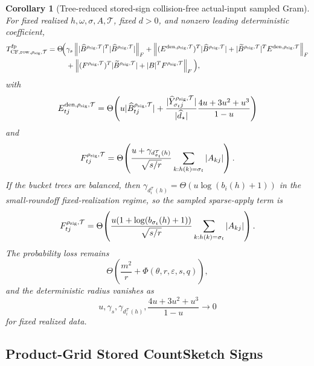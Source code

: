 \documentclass[11pt]{article}
\newcommand{\Frob}[1]{\left\lVert #1\right\rVert_F}
\newcommand{\eps}{\varepsilon}
\newtheorem{corollary}[theorem]{Corollary}
\theoremstyle{remark}
\begin{document}
\begin{corollary}[Tree-reduced stored-sign collision-free actual-input sampled Gram]
For fixed realized \(h,\omega,\sigma,A,\mathcal T\), fixed \(d>0\), and
nonzero leading deterministic coefficient,
\[
\begin{aligned}
  T_{{\rm CF,row},\rho_{\rm sig},\mathcal T}^{\rm fp}
  =
  \Theta\!\Big(
  &\gamma_s\Frob{
      |\widehat B^{\rho_{\rm sig},\mathcal T}|^T
      |\widehat B^{\rho_{\rm sig},\mathcal T}|}
  +
  \Frob{
      (E^{{\rm den},\rho_{\rm sig},\mathcal T})^T
      |\widehat B^{\rho_{\rm sig},\mathcal T}|
      +
      |\widetilde B^{\rho_{\rm sig},\mathcal T}|^T
      E^{{\rm den},\rho_{\rm sig},\mathcal T}}
  \\
  &+
  \Frob{
      (F^{\rho_{\rm sig},\mathcal T})^T
      |\widetilde B^{\rho_{\rm sig},\mathcal T}|
      +
      |B|^TF^{\rho_{\rm sig},\mathcal T}}
  \Big),
\end{aligned}
\]
with
\[
  E^{{\rm den},\rho_{\rm sig},\mathcal T}_{tj}
  =
  \Theta\!\left(
    u|\widehat B^{\rho_{\rm sig},\mathcal T}_{tj}|
    +
    \frac{|\widehat Y^{\rho_{\rm sig},\mathcal T}_{\sigma_tj}|}
         {|\widehat d_\star|}
    \frac{4u+3u^2+u^3}{1-u}
  \right)
\]
and
\[
  F^{\rho_{\rm sig},\mathcal T}_{tj}
  =
  \Theta\!\left(
    \frac{u+\gamma_{d_{\sigma_t}^{\mathcal T}(h)}}{\sqrt{s/r}}
    \sum_{k:h(k)=\sigma_t}|A_{kj}|
  \right).
\]
If the bucket trees are balanced, then
\(\gamma_{d_i^{\mathcal T}(h)}=\Theta(u\log(b_i(h)+1))\) in the
small-roundoff fixed-realization regime, so the sampled sparse-apply term is
\[
  F^{\rho_{\rm sig},\mathcal T}_{tj}
  =
  \Theta\!\left(
    \frac{u(1+\log(b_{\sigma_t}(h)+1))}{\sqrt{s/r}}
    \sum_{k:h(k)=\sigma_t}|A_{kj}|
  \right).
\]
The probability loss remains
\[
  \Theta\!\left(\frac{m^2}{r}+\Phi(\theta,r,\eps,s,q)\right),
\]
and the deterministic radius vanishes as
\[
  u,\gamma_s,\gamma_{d_i^{\mathcal T}(h)},
  \frac{4u+3u^2+u^3}{1-u}\to0
\]
for fixed realized data.
\end{corollary}

\subsection*{Product-Grid Stored CountSketch Signs}
\end{document}
